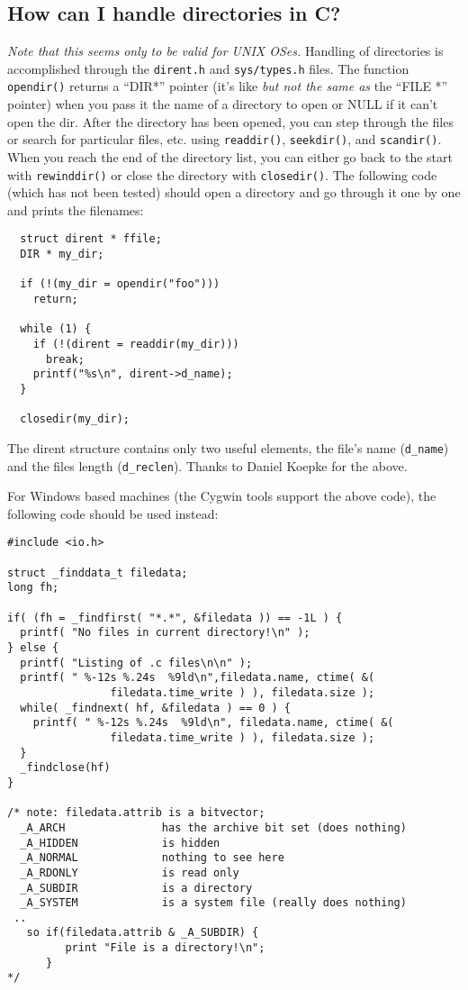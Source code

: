 \documentclass[11pt]{article}
\begin{document}
\subsection{How can I handle directories in C?}
{\em Note that this seems only to be valid for UNIX OSes.} Handling of directories is accomplished through the \texttt{dirent.h} and \texttt{sys/types.h} files.  The function \texttt{opendir()} returns a ``DIR*'' pointer (it's like {\em but not the same as} the ``FILE *'' pointer) when you pass it the name of a directory to open or NULL if it can't open the dir.  After the directory has been opened, you can step through the files or search for particular files, etc. using \texttt{readdir()}, \texttt{seekdir()}, and \texttt{scandir()}.  When you reach the end of the directory list, you can either go back to the start with \texttt{rewinddir()} or close the directory with \texttt{closedir()}.  The following code (which has not been tested) should open a directory and go through it one by one and prints the filenames:
\begin{verbatim}
  struct dirent * ffile;
  DIR * my_dir;

  if (!(my_dir = opendir("foo")))
    return;

  while (1) {
    if (!(dirent = readdir(my_dir)))
      break;
    printf("%s\n", dirent->d_name);
  }

  closedir(my_dir);
\end{verbatim}
The dirent structure contains only two useful elements, the file's name (\texttt{d\_name}) and the files length (\texttt{d\_reclen}).\newline
Thanks to Daniel Koepke for the above.
\par
For Windows based machines (the Cygwin tools support the above code), the following code should be used instead:
\begin{verbatim}
#include <io.h>

struct _finddata_t filedata;
long fh;

if( (fh = _findfirst( "*.*", &filedata )) == -1L ) {
  printf( "No files in current directory!\n" );
} else {
  printf( "Listing of .c files\n\n" );
  printf( " %-12s %.24s  %9ld\n",filedata.name, ctime( &(
                filedata.time_write ) ), filedata.size );
  while( _findnext( hf, &filedata ) == 0 ) {
    printf( " %-12s %.24s  %9ld\n", filedata.name, ctime( &(
                filedata.time_write ) ), filedata.size );
  }
  _findclose(hf)
}

/* note: filedata.attrib is a bitvector;
  _A_ARCH               has the archive bit set (does nothing)
  _A_HIDDEN             is hidden
  _A_NORMAL             nothing to see here
  _A_RDONLY             is read only
  _A_SUBDIR             is a directory
  _A_SYSTEM             is a system file (really does nothing)
 ..
   so if(filedata.attrib & _A_SUBDIR) {
         print "File is a directory!\n";
      }
*/
\end{verbatim}
\end{document}
